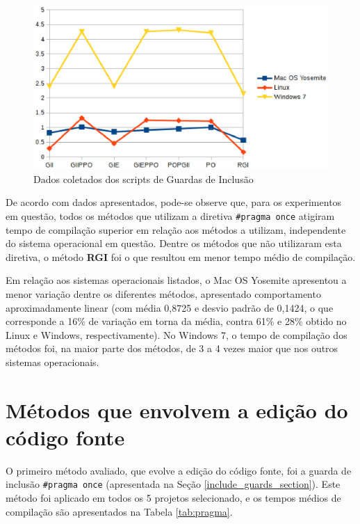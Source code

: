 \begin{figure}[!h]
    \centering
        \includegraphics{figuras/graficos/benchmark.eps}
    \caption{Dados coletados dos scripts de Guardas de Inclusão}
    \label{benchmark_guardas_de_inclusao}
\end{figure}

De acordo com dados apresentados, pode-se observe que, para os experimentos em questão, todos os métodos que utilizam a diretiva 
\texttt{\#pragma once} atigiram tempo de compilação superior em relação aos métodos a utilizam, independente do sistema operacional em questão.
Dentre os métodos que não utilizaram esta diretiva, o método \textbf{RGI} foi o que resultou em menor tempo médio de compilação.

Em relação aos sistemas operacionais listados, o Mac OS Yosemite apresentou a menor variação dentre os diferentes métodos, apresentado comportamento 
aproximadamente linear (com média 0,8725 e desvio padrão de 0,1424, o que corresponde a 16\% de variação em torna da média, contra 61\% e 28\% obtido
no Linux e Windows, respectivamente).  No Windows 7, o tempo de compilação dos métodos foi, na maior parte dos métodos, de 3 a 4 vezes maior que nos outros sistemas operacionais. 

\section{Métodos que envolvem a edição do código fonte}

O primeiro método avaliado, que evolve a edição do código fonte, foi a guarda de inclusão \texttt{\#pragma once} (apresentada na Seção \ref{include_guards_section}). Este método foi aplicado em todos os 5 projetos selecionado, e os tempos médios de compilação são apresentados na Tabela \ref{tab:pragma}.

